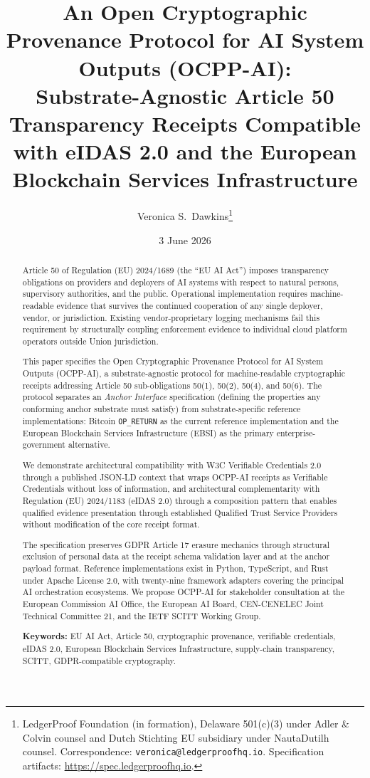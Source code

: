 \documentclass[11pt,a4paper]{article}
\title{
  \vspace{-2em}
  An Open Cryptographic Provenance Protocol for AI System Outputs (OCPP-AI):\\
  Substrate-Agnostic Article 50 Transparency Receipts Compatible\\ with eIDAS 2.0 and the European Blockchain Services Infrastructure
}
\author{
  Veronica S.\ Dawkins\thanks{LedgerProof Foundation (in formation), Delaware 501(c)(3) under Adler \& Colvin counsel and Dutch Stichting EU subsidiary under NautaDutilh counsel. Correspondence: \texttt{veronica@ledgerproofhq.io}. Specification artifacts: \url{https://spec.ledgerproofhq.io}.}
}
\date{3 June 2026}
\begin{document}
\maketitle

\begin{abstract}
\noindent
Article 50 of Regulation (EU) 2024/1689 (the ``EU AI Act'') imposes transparency obligations on providers and deployers of AI systems with respect to natural persons, supervisory authorities, and the public. Operational implementation requires machine-readable evidence that survives the continued cooperation of any single deployer, vendor, or jurisdiction. Existing vendor-proprietary logging mechanisms fail this requirement by structurally coupling enforcement evidence to individual cloud platform operators outside Union jurisdiction.

This paper specifies the Open Cryptographic Provenance Protocol for AI System Outputs (OCPP-AI), a substrate-agnostic protocol for machine-readable cryptographic receipts addressing Article 50 sub-obligations 50(1), 50(2), 50(4), and 50(6). The protocol separates an \emph{Anchor Interface} specification (defining the properties any conforming anchor substrate must satisfy) from substrate-specific reference implementations: Bitcoin \texttt{OP\_RETURN} as the current reference implementation and the European Blockchain Services Infrastructure (EBSI) as the primary enterprise-government alternative.

We demonstrate architectural compatibility with W3C Verifiable Credentials 2.0 through a published JSON-LD context that wraps OCPP-AI receipts as Verifiable Credentials without loss of information, and architectural complementarity with Regulation (EU) 2024/1183 (eIDAS 2.0) through a composition pattern that enables qualified evidence presentation through established Qualified Trust Service Providers without modification of the core receipt format.

The specification preserves GDPR Article 17 erasure mechanics through structural exclusion of personal data at the receipt schema validation layer and at the anchor payload format. Reference implementations exist in Python, TypeScript, and Rust under Apache License 2.0, with twenty-nine framework adapters covering the principal AI orchestration ecosystems. We propose OCPP-AI for stakeholder consultation at the European Commission AI Office, the European AI Board, CEN-CENELEC Joint Technical Committee 21, and the IETF SCITT Working Group.

\medskip
\noindent\textbf{Keywords:} EU AI Act, Article 50, cryptographic provenance, verifiable credentials, eIDAS 2.0, European Blockchain Services Infrastructure, supply-chain transparency, SCITT, GDPR-compatible cryptography.
\end{abstract}
\end{document}
